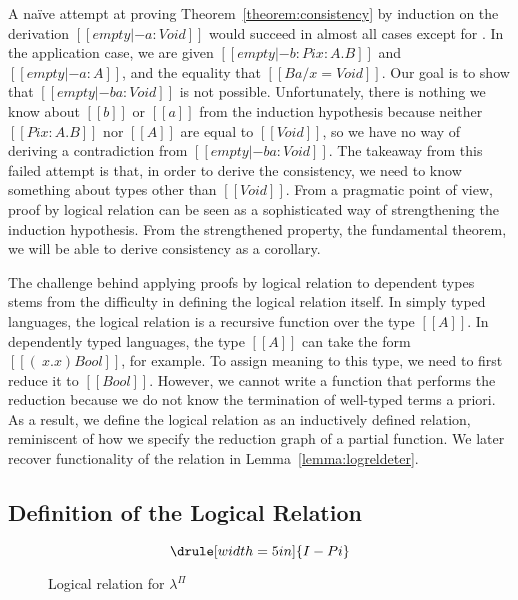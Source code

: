 \documentclass[\ifpublic nolinenum\else\fi,online,OA]{jfp}
\newcommand{\jc}[1]{}
\newcommand{\lang}{$\lambda^{\Pi}$\xspace}
\theoremstyle{definition}
\begin{document}
A na\"ive attempt at proving Theorem~\ref{theorem:consistency} by
induction on the derivation $[[empty |- a : Void]]$ would succeed in
almost all cases except for . In the application
case, we are given $[[empty |- b : Pi x : A . B]]$ and $[[empty |- a : A]]$, and
the equality that $[[B {a / x} = Void]]$. Our goal is to show that
$[[empty |- b a : Void]]$ is not possible. Unfortunately, there is
nothing we know about $[[b]]$ or $[[a]]$ from the induction hypothesis
because neither $[[Pi x : A . B]]$ nor $[[A]]$ are equal to $[[Void]]$,
so we have no way of deriving a contradiction from $[[empty |- b a :
Void]]$. The takeaway from this failed attempt is that, in order to
derive the consistency, we need to know something about types other
than $[[Void]]$. From a pragmatic point of view, proof by logical
relation can be seen as a sophisticated way of strengthening the
induction hypothesis. From the strengthened property, the fundamental
theorem, we will be able to derive consistency as a corollary.

\jc{Minor comment but ``proof by logical relation'' sounds grammatically strange to me,
but I'm not sure whether ``proof by logical relations'' or
``proof by a logical relation'' would be any more correct...}

The challenge behind applying proofs by logical relation to dependent types
stems from the difficulty in defining the logical relation itself. In simply
typed languages, the logical relation is a recursive function over the type
$[[A]]$. In dependently typed languages, the type $[[A]]$ can take the form
$[[(\ x . x ) Bool]]$, for example. To assign meaning to this type, we need to
first reduce it to $[[Bool]]$. However, we cannot write a function that
performs the reduction because we do not know the termination of well-typed
terms a priori. As a result, we define the logical relation as an inductively
defined relation, reminiscent of how we specify the reduction graph of a
partial function.
We later recover functionality of the relation in Lemma~\ref{lemma:logreldeter}.

\subsection{Definition of the Logical Relation}

\begin{figure}
\[ \drule[width=5in]{I-Pi} \]
\caption{Logical relation for \lang}
\label{fig:logrel}
\end{figure}
\end{document}
